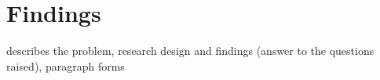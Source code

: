 \chapter{Findings} %

\label{ch:findings} %
describes the problem, research design and findings (answer to the questions raised),
paragraph forms